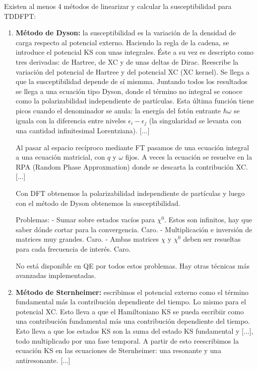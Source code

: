   Existen al menos 4 métodos de linearizar y calcular la susceptibilidad para TDDFPT:
    \begin{enumerate}
      \item \textbf{Método de Dyson:} la susceptibilidad es la variación de la densidad de carga respecto al potencial externo. Haciendo la regla de la cadena, se introduce el potencial KS con unas integrales. Éste a su vez es descripto como tres derivadas: de Hartree, de XC y de unas deltas de Dirac. Reescribe la variación del potencial de Hartree y del potencial XC (XC kernel). Se llega a que la susceptibilidad depende de sí mismma. Juntando todos los resultados se llega a una ecuación tipo Dyson, donde el término no integral se conoce como la polarizabilidad independiente de partículas. Esta última función tiene picos cuando el denominador se anula: la energía del fotón entrante $\hbar\omega$ se iguala con la diferencia entre niveles $\epsilon_i - \epsilon_j$ (la singularidad se levanta con una cantidad infinitesimal Lorentziana).
      [...]

      Al pasar al espacio recíproco mediante FT pasamos de una ecuación integral a una ecuación matricial, con $q$ y $\omega$ fijos. A veces la ecuación se resuelve en la RPA (Random Phase Approxmation) donde se descarta la contribución XC.
      [...]

      Con DFT obtenemos la polarizabilidad independiente de partículas y luego con el método de Dyson obtenemos la susceptibilidad.

      Problemas:
        - Sumar sobre estados vacíos para $\chi^0$. Estos son infinitos, hay que saber dónde cortar para la convergencia. Caro.
        - Multiplicación e inversión de matrices muy grandes. Caro.
        - Ambas matrices $\chi$ y $\chi^0$ deben ser resueltas para cada frecuencia de interés. Caro.

      No está disponible en QE por todos estos problemas. Hay otras técnicas más avanzadas implementadas.
      \item \textbf{Método de Sternheimer:} escribimos el potencial externo como el término fundamental más la contribución dependiente del tiempo. Lo mismo para el potencial XC. Esto lleva a que el Hamiltoniano KS se pueda escribiir como una contribución fundamental más una contribución dependiente del tiempo. Esto lleva a que los estados KS son la suma del estado KS fundamental y [...], todo multiplicado por una fase temporal. A partir de esto reescribimos la ecuación KS en las ecuaciones de Sternheimer: una resonante y una antiresonante.
        [...]


\end{enumerate}
